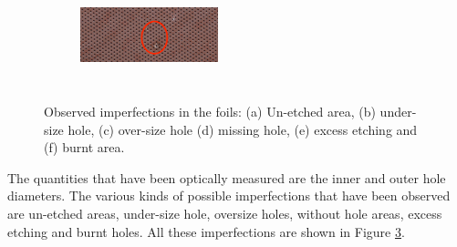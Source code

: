 \begin{figure}[!htbp]
\begin{subfigure}[b]{0.29\textwidth}
        \caption{ }
        \label{fig:O_5b}
    \end{subfigure}
    \centering
    \begin{subfigure}[b]{0.29\textwidth}
        \includegraphics[width=4cm, height=3cm]{figures/GEM/figures/3f.jpg}
        \caption{ }
        \label{fig:O_5c}
    \end{subfigure}
   \caption{Observed imperfections in the foils: (a) Un-etched area, (b) under-size hole, (c) over-size hole (d) missing hole, (e) excess etching and (f) burnt area.} \label{fig:Optical_01}
\end{figure}

The quantities that have been optically measured are the inner and outer hole diameters. The various kinds of possible imperfections that have been observed are un-etched areas, under-size hole, oversize holes, without hole areas, excess etching and burnt holes. All these imperfections are shown in Figure \ref{fig:Optical_01}. 

